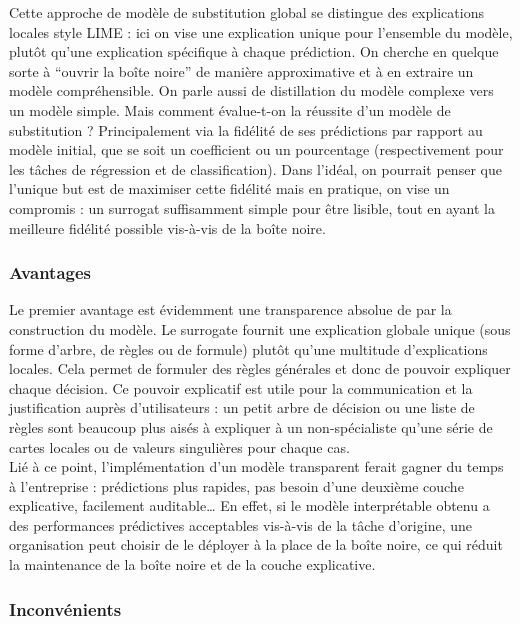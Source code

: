 \documentclass{article}
\begin{document}
Cette approche de modèle de substitution global se distingue des explications locales style LIME : ici on vise une explication unique pour l’ensemble du modèle, plutôt qu’une explication spécifique à chaque prédiction. On cherche en quelque sorte à “ouvrir la boîte noire” de manière approximative et à en extraire un modèle compréhensible. On parle aussi de distillation du modèle complexe vers un modèle simple. Mais comment évalue-t-on la réussite d’un modèle de substitution ? Principalement via la fidélité de ses prédictions par rapport au modèle initial, que se soit un coefficient ou un pourcentage (respectivement pour les tâches de régression et de classification). Dans l'idéal, on pourrait penser que l’unique but est de maximiser cette fidélité mais en pratique, on vise un compromis : un surrogat suffisamment simple pour être lisible, tout en ayant la meilleure fidélité possible vis-à-vis de la boîte noire.

    \subsubsection{Avantages}

    \quad Le premier avantage est évidemment une transparence absolue de par la construction du modèle. Le surrogate fournit une explication globale unique (sous forme d’arbre, de règles ou de formule) plutôt qu’une multitude d’explications locales. Cela permet de formuler des règles générales et donc de pouvoir expliquer chaque décision. Ce pouvoir explicatif est utile pour la communication et la justification auprès d’utilisateurs : un petit arbre de décision ou une liste de règles sont beaucoup plus aisés à expliquer à un non-spécialiste qu’une série de cartes locales ou de valeurs singulières pour chaque cas.\\
    
    Lié à ce point, l'implémentation d’un modèle transparent ferait gagner du temps à l'entreprise : prédictions plus rapides, pas besoin d’une deuxième couche explicative, facilement auditable… En effet, si le modèle interprétable obtenu a des performances prédictives acceptables vis-à-vis de la tâche d’origine, une organisation peut choisir de le déployer à la place de la boîte noire, ce qui réduit la maintenance de la boîte noire et de la couche explicative.

    \subsubsection{Inconvénients}
\end{document}
